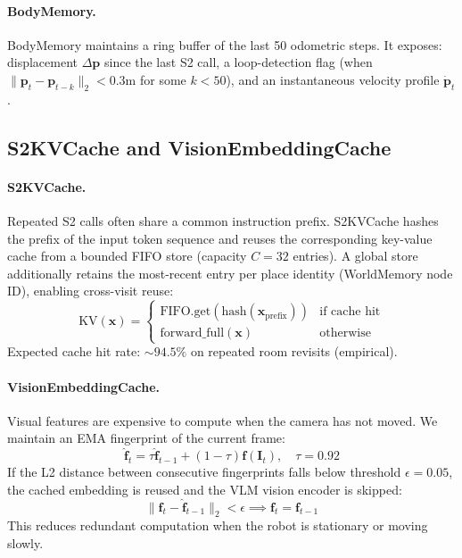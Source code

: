 \documentclass[10pt,twocolumn,letterpaper]{article}
\begin{document}
\paragraph{BodyMemory.}
BodyMemory maintains a ring buffer of the last 50 odometric steps. It exposes: displacement $\Delta\mathbf{p}$ since the last S2 call, a loop-detection flag (when $\|\mathbf{p}_t - \mathbf{p}_{t-k}\|_2 < 0.3\text{m}$ for some $k < 50$), and an instantaneous velocity profile $\dot{\mathbf{p}}_t$.

\subsection{S2KVCache and VisionEmbeddingCache}

\paragraph{S2KVCache.}
Repeated S2 calls often share a common instruction prefix. S2KVCache hashes the prefix of the input token sequence and reuses the corresponding key-value cache from a bounded FIFO store (capacity $C=32$ entries). A global store additionally retains the most-recent entry per place identity (WorldMemory node ID), enabling cross-visit reuse:
\begin{equation}
  \text{KV}(\mathbf{x}) = \begin{cases}
    \text{FIFO.get}(\text{hash}(\mathbf{x}_{\text{prefix}})) & \text{if cache hit} \\
    \text{forward\_full}(\mathbf{x}) & \text{otherwise}
  \end{cases}
\end{equation}
Expected cache hit rate: ${\sim}94.5\%$ on repeated room revisits (empirical).

\paragraph{VisionEmbeddingCache.}
Visual features are expensive to compute when the camera has not moved. We maintain an EMA fingerprint of the current frame:
\begin{equation}
  \hat{\mathbf{f}}_t = \tau \hat{\mathbf{f}}_{t-1} + (1-\tau) \mathbf{f}(\mathbf{I}_t), \quad \tau = 0.92
  \label{eq:vec_ema}
\end{equation}
If the L2 distance between consecutive fingerprints falls below threshold $\epsilon=0.05$, the cached embedding is reused and the VLM vision encoder is skipped:
\begin{equation}
  \|\hat{\mathbf{f}}_t - \hat{\mathbf{f}}_{t-1}\|_2 < \epsilon \implies \mathbf{f}_t = \mathbf{f}_{t-1}
\end{equation}
This reduces redundant computation when the robot is stationary or moving slowly.
\end{document}
